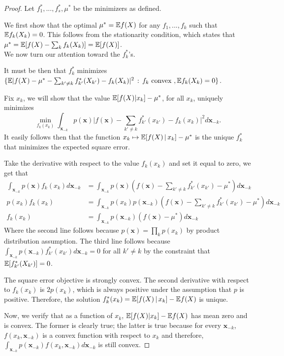  \begin{proof}
 
Let $f^*_1,...,f^*_s, \mu^*$ be the minimizers as defined. 

We first show that the optimal $\mu^* = {\mathbb E} f(X)$ for any $f_1, ..., f_k$ such that ${\mathbb E} f_k(X_k) = 0$. This follows from the stationarity condition, which states that $\mu^* = {\mathbb E}[ f(X) - \sum_k f_k(X_k)] = {\mathbb E}[ f(X) ]$.\\

We now turn our attention toward the $f^*_k$'s. 

It must be then that $f^*_k$ minimizes $\{ {\mathbb E} | f(X) - \mu^* - \sum_{k' \neq k} f^*_{k'} (X_{k'}) - f_k (X_k)|^2 \,:\, f_k \textrm{ convex }, {\mathbb E} f_k(X_k) = 0 \}$.

Fix $x_k$, we will show that the value ${\mathbb E}[ f(X) | x_k] - \mu^*$, for all $x_k$,  uniquely minimizes 
\[
\min_{ f_k(x_k) } \int_{\mathbf{x}_{-k}} p(\mathbf{x}) 
         \big| f(\mathbf{x}) - \sum_{k' \neq k} f^*_{k'} (x_{k'}) - f_k (x_k)\big|^2 d \mathbf{x}_{-k}.
\]
It easily follows then that the function $x_k \mapsto {\mathbb E}[ f(X) {\,|\,} x_k] - \mu^*$ is the unique $f^*_k$ that minimizes the expected square error.


Take the derivative with respect to the value $f_k(x_k)$ and set it equal to zero, we get that
\begin{align*}
\int_{\mathbf{x}_{-k}} p(\mathbf{x}) f_k(x_k) d \mathbf{x}_{-k} &= 
  \int_{\mathbf{x}_{-k}} p(\mathbf{x}) 
      ( f(\mathbf{x})-\sum_{k' \neq k} f^*_{k'}(x_{k'})-\mu^*) d \mathbf{x}_{-k} \\  
p(x_k) f_k(x_k) &= \int_{\mathbf{x}_{-k}} p(x_k)
     p(\mathbf{x}_{-k}) ( f(\mathbf{x}) - \sum_{k' \neq k} f^*_{k'} (x_{k'})-\mu^*) 
              d \mathbf{x}_{-k} \\
f_k(x_k) &= \int_{\mathbf{x}_{-k}} 
       p(\mathbf{x}_{-k}) (f(\mathbf{x}) -\mu^*) d \mathbf{x}_{-k} 
 \end{align*}
Where the second line follows because $p(\mathbf{x}) = \prod_k p(x_k)$ by product distribution assumption. The third line follows because $\int_{\mathbf{x}_{-k}} p(\mathbf{x}_{-k}) f^*_{k'}(x_{k'}) d\mathbf{x}_{-k} = 0$ for all $k' \neq k$ by the constraint that ${\mathbb E}[f^*_{k'}(X_{k'})] = 0$. 

The square error objective is strongly convex. The second derivative with respect to $f_k(x_k)$ is $2 p(x_k)$, which is always positive under the assumption that $p$ is positive. Therefore, the solution $f^*_k(x_k) = {\mathbb E}[ f(X) {\,|\,} x_k ] - {\mathbb E} f(X)$ is unique.



Now, we verify that as a function of $x_k$, ${\mathbb E}[ f(X) | x_k] - {\mathbb E} f(X)$ has mean zero and is convex. The former is clearly true; the latter is true because for every $\mathbf{x}_{-k}$, $f(x_k, \mathbf{x}_{-k})$ is a convex function with respect to $x_k$ and therefore, $\int_{\mathbf{x}_{-k}} p(\mathbf{x}_{-k}) f(x_k, \mathbf{x}_{-k}) d \mathbf{x}_{-k}$ is still convex. 
 
 \end{proof}
 
